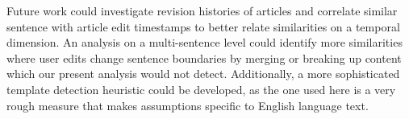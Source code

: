 \documentclass[letterpaper]{article}
\begin{document}
Future work could investigate revision histories of articles and correlate similar sentence with article edit timestamps to better relate similarities on a temporal dimension. An analysis on a multi-sentence level could identify more similarities where user edits change sentence boundaries by merging or breaking up content which our present analysis would not detect. Additionally, a more sophisticated template detection heuristic could be developed, as the one used here is a very rough measure that makes assumptions specific to English language text.



\small
 
\end{document}
